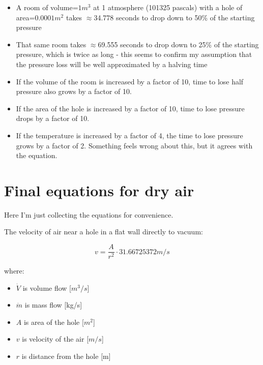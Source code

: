 \documentclass[a4paper]{article}
\begin{document}
    \begin{itemize}
        \item A room of volume=$1m^3$ at 1 atmosphere (101325 pascals) with a hole of area=$0.0001m^2$ takes $\approx$34.778 seconds to drop down to 50\% of the starting pressure
        
        \item That same room takes $\approx$69.555 seconds to drop down to 25\% of the starting pressure, which is twice as long - this seems to confirm my assumption that the pressure loss will be well approximated by a halving time
        
        \item If the volume of the room is increased by a factor of 10, time to lose half pressure also grows by a factor of 10.
        
        \item If the area of the hole is increased by a factor of 10, time to lose pressure drops by a factor of 10.
        
        \item If the temperature is increased by a factor of 4, the time to lose pressure grows by a factor of 2. Something feels wrong about this, but it agrees with the equation.
    \end{itemize}
    
    \pagebreak
    
    \section{Final equations for dry air}
    
    Here I'm just collecting the equations for convenience.
    
    \bigskip
    
    The velocity of air near a hole in a flat wall directly to vacuum:
    
    $$ v = \frac{A}{r^2} \cdot 31.66725372m/s$$
    	
    where:
    	
    \begin{itemize}
    	\item $\dot{V}$ is volume flow [$m^3/s$]
    		
    	\item $\dot{m}$ is mass flow [kg/s]
    		
    	\item $A$ is area of the hole [$m^2$]
    		
    	\item $v$ is velocity of the air [$m/s$]
    		
    	\item $r$ is distance from the hole [m]
   	\end{itemize}
   	
\end{document}
